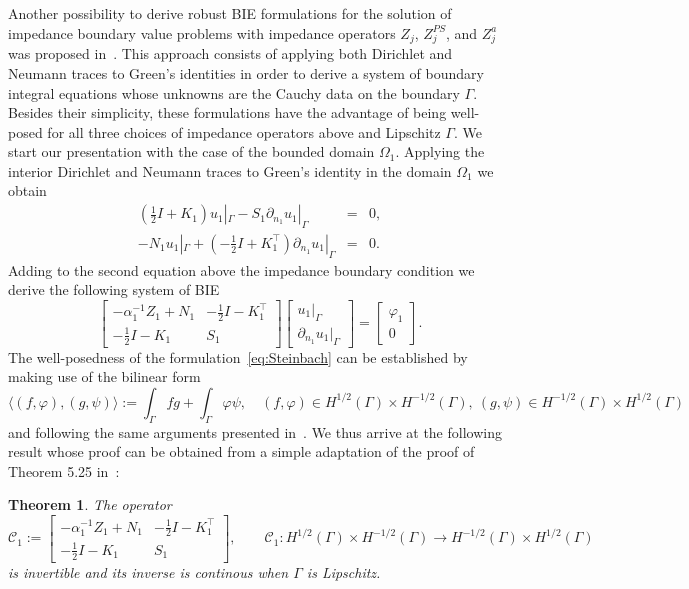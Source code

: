 \documentclass[11pt]{article}
\numberwithin{equation}{section}
\newtheorem{theorem}{Theorem}[section]
\begin{document}
 Another possibility to derive robust BIE formulations for the solution of impedance boundary value problems with impedance operators $Z_j$, $Z_j^{PS}$, and $Z_j^a$ was proposed in~\cite{steinbach2011stable}. This approach consists of applying both Dirichlet and Neumann traces to Green's identities in order to derive a system of boundary integral equations whose unknowns are the Cauchy data on the boundary $\Gamma$. Besides their simplicity, these formulations have the advantage of being well-posed for all three choices of impedance operators above and Lipschitz $\Gamma$. We start our presentation with the case of the bounded domain $\Omega_1$. Applying the interior Dirichlet and Neumann traces to Green's identity in the domain $\Omega_1$ we obtain
\begin{eqnarray*}
  \left(\frac{1}{2}I + K_1\right)u_1|_\Gamma -S_1\partial_{n_1}u_1|_\Gamma&=&0,\\
  -N_1u_1|_\Gamma+\left(-\frac{1}{2}I+K_1^\top\right)\partial_{n_1}u_1|_\Gamma&=&0.
\end{eqnarray*}
Adding to the second equation above the impedance boundary condition we derive the following system of BIE
\begin{equation}\label{eq:Steinbach}
  \begin{bmatrix}-\alpha_1^{-1}Z_1+N_1 & -\frac{1}{2}I-K_1^\top\\ -\frac{1}{2}I - K_1 & S_1 \end{bmatrix} \begin{bmatrix}u_1|_\Gamma\\\partial_{n_1}u_1|_\Gamma\end{bmatrix} =\begin{bmatrix}\varphi_1\\0 \end{bmatrix}.
\end{equation}
The well-posedness of the formulation~\eqref{eq:Steinbach} can be established by making use of the bilinear form 
\[
\langle (f,\varphi),(g,\psi) \rangle:= \int_\Gamma fg+\int_\Gamma \varphi\psi,\quad (f,\varphi)\in H^{1/2}(\Gamma)\times H^{-1/2}(\Gamma),\ (g,\psi)\in H^{-1/2}(\Gamma)\times H^{1/2}(\Gamma)
\] 
and following the same arguments presented in~\cite{steinbach2011stable}. We thus arrive at the following result whose proof can be obtained from a simple adaptation of the proof of Theorem 5.25 in~\cite{windisch2011boundary}:
\begin{theorem}\label{th:inv_3}
  The operator
  \[
  \mathcal{C}_1:=\begin{bmatrix}-\alpha_1^{-1}Z_1+N_1 & -\frac{1}{2}I-K_1^\top\\ -\frac{1}{2}I - K_1 & S_1 \end{bmatrix},\qquad \mathcal{C}_1: H^{1/2}(\Gamma)\times H^{-1/2}(\Gamma)\to H^{-1/2}(\Gamma)\times H^{1/2}(\Gamma)
  \]
  is invertible and its inverse is continous when $\Gamma$ is Lipschitz.
\end{theorem}
\end{document}

